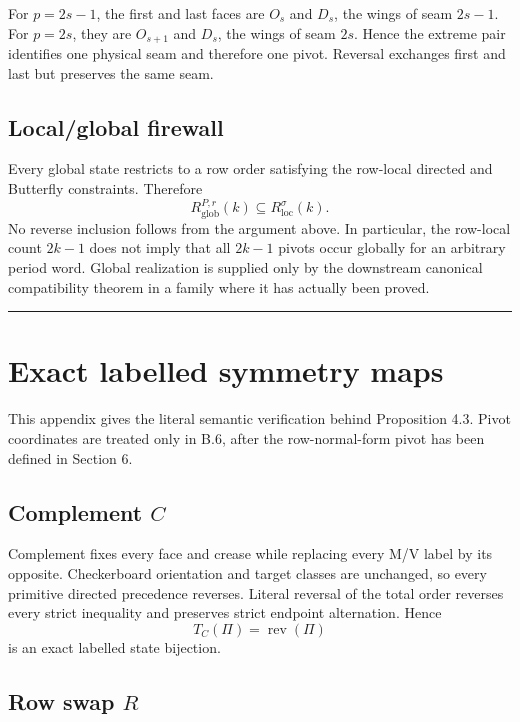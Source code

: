 \documentclass[11pt]{article}
\theoremstyle{definition}
\theoremstyle{remark}
\begin{document}
For \(p=2s-1\), the first and last faces are \(O_s\) and \(D_s\), the
wings of seam \(2s-1\). For \(p=2s\), they are \(O_{s+1}\) and \(D_s\),
the wings of seam \(2s\). Hence the extreme pair identifies one physical
seam and therefore one pivot. Reversal exchanges first and last but
preserves the same seam.

\subsection{Local/global firewall}\label{a.5.-localglobal-firewall}

Every global state restricts to a row order satisfying the row-local
directed and Butterfly constraints. Therefore \[
R_{\mathrm{glob}}^{P,r}(k)\subseteq R_{\mathrm{loc}}^\sigma(k).
\] No reverse inclusion follows from the argument above. In particular,
the row-local count \(2k-1\) does not imply that all \(2k-1\) pivots
occur globally for an arbitrary period word. Global realization is
supplied only by the downstream canonical compatibility theorem in a
family where it has actually been proved.

\begin{center}\rule{0.5\linewidth}{0.5pt}\end{center}

\section{Exact labelled symmetry maps}\label{appendix-b.-exact-labelled-symmetry-maps}

This appendix gives the literal semantic verification behind Proposition
4.3. Pivot coordinates are treated only in B.6, after the
row-normal-form pivot has been defined in Section 6.

\subsection{\texorpdfstring{Complement
\(C\)}{Complement C}}\label{b.1.-complement-c}

Complement fixes every face and crease while replacing every M/V label
by its opposite. Checkerboard orientation and target classes are
unchanged, so every primitive directed precedence reverses. Literal
reversal of the total order reverses every strict inequality and
preserves strict endpoint alternation. Hence \[
T_C(\Pi)=\operatorname{rev}(\Pi)
\] is an exact labelled state bijection.

\subsection{\texorpdfstring{Row swap
\(R\)}{Row swap R}}\label{b.2.-row-swap-r}
\end{document}
